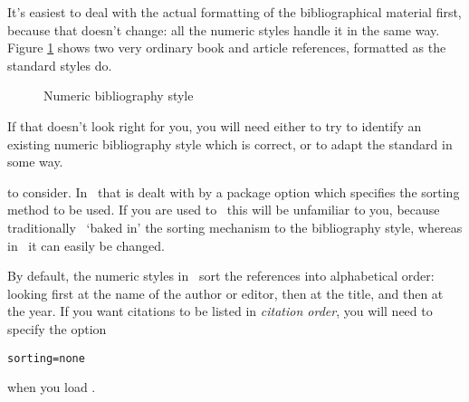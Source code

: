 It's easiest to deal with the actual formatting of the bibliographical
material first, because that doesn't change: all the numeric styles handle it
in the same way. Figure \ref{numeric-examples} shows two very ordinary
book and article references, formatted as the standard styles do.

\begin{figure}
\caption{Numeric bibliography style\label{numeric-examples}}
\end{figure}

If that doesn't look right for you, you will need either to try to
identify an existing numeric bibliography style which is correct, or
to adapt the standard in some way.

 to consider. In \biblatex\ that
is dealt with by a package option which specifies the sorting method
to be used. If you are used to \bibtex\ this will be unfamiliar to
you, because traditionally \bibtex\ `baked in' the sorting mechanism
to the bibliography style, whereas in \biblatex\ it can easily be
changed.

By default, the numeric styles in \biblatex\ sort the references into
alphabetical order: looking first at the name of the author or editor,
then at the title, and then at the year. If you want citations to be
listed in \emph{citation order}, you will need to specify the option
\begin{center}
\verb|sorting=none|
\end{center}
when you load \biblatex.

